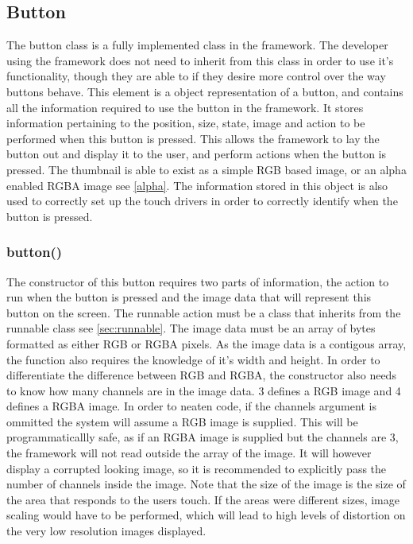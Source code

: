 \subsection{Button}
\label{sec:button}

The button class is a fully implemented class in the framework. The developer using the framework does not need to inherit from this class in order to use it's functionality, though they are able to if they desire more control over the way buttons behave. This element is a object representation of a button, and contains all the information required to use the button in the framework. It stores information pertaining to the position, size, state, image and action to be performed when this button is pressed. This allows the framework to lay the button out and display it to the user, and perform actions when the button is pressed. The thumbnail is able to exist as a simple RGB based image, or an alpha enabled RGBA image see \ref{alpha}. The information stored in this object is also used to correctly set up the touch drivers in order to correctly identify when the button is pressed.

\subsubsection{button()}

The constructor of this button requires two parts of information, the action to run when the button is pressed and the image data that will represent this button on the screen. The runnable action must be a class that inherits from the runnable class see \ref{sec:runnable}. The image data must be an array of bytes formatted as either RGB or RGBA pixels. As the image data is a contigous array, the function also requires the knowledge of it's width and height. In order to differentiate the difference between RGB and RGBA, the constructor also needs to know how many channels are in  the image data. 3 defines a RGB image and 4 defines a RGBA image. In order to neaten code, if the channels argument is ommitted the system will assume a RGB image is supplied. This will be programmaticallly safe, as if an RGBA image is supplied but the channels are 3, the framework will not read outside the array of the image. It will however display a corrupted looking image, so it is recommended to explicitly pass the number of channels inside the image. 
Note that the size of the image is the size of the area that responds to the users touch. If the areas were different sizes, image scaling would have to be performed, which will lead to high levels of distortion on the very low resolution images displayed.

